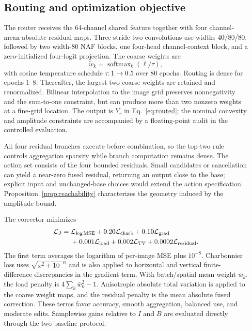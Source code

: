 \documentclass[12pt]{article}
\newcommand{\MSE}{\operatorname{MSE}}
\newcommand{\softmax}{\operatorname{softmax}}
\begin{document}
\subsection{Routing and optimization objective}
The router receives the 64-channel shared feature together with four channel-mean absolute residual maps. Three stride-two convolutions use widths 40/80/80, followed by two width-80 NAF blocks, one four-head channel-context block, and a zero-initialized four-logit projection. The coarse weights are
\begin{equation}
\widetilde w_k=\softmax_k(\ell/\tau),
\end{equation}
with cosine temperature schedule $\tau:1\rightarrow0.5$ over 80 epochs. Routing is dense for epochs 1--8. Thereafter, the largest two coarse weights are retained and renormalized. Bilinear interpolation to the image grid preserves nonnegativity and the sum-to-one constraint, but can produce more than two nonzero weights at a fine-grid location. The output is $Y_r$ in Eq.~\eqref{eq:routed}; the nominal convexity and amplitude constraints are accompanied by a floating-point audit in the controlled evaluation.

All four residual branches execute before combination, so the top-two rule controls aggregation sparsity while branch computation remains dense. The action set consists of the four bounded residuals. Small candidates or cancellation can yield a near-zero fused residual, returning an output close to the base; explicit input and unchanged-base choices would extend the action specification. Proposition~\ref{prop:reachability} characterizes the geometry induced by the amplitude bound.

The corrector minimizes
\begin{align}
\mathcal L_J={}&\mathcal L_{\log\MSE}
+0.20\mathcal L_{\rm charb}
+0.10\mathcal L_{\rm grad}\nonumber\\
&+0.001\mathcal L_{\rm load}
+0.002\mathcal L_{\rm TV}
+0.0002\mathcal L_{\rm residual}.
\end{align}
The first term averages the logarithm of per-image MSE plus $10^{-8}$. Charbonnier loss uses $\sqrt{x^2+10^{-6}}$ and is also applied to horizontal and vertical finite-difference discrepancies in the gradient term. With batch/spatial mean weight $\bar w_k$, the load penalty is $4\sum_k\bar w_k^2-1$. Anisotropic absolute total variation is applied to the coarse weight maps, and the residual penalty is the mean absolute fused correction. These terms favor accuracy, smooth aggregation, balanced use, and moderate edits. Samplewise gains relative to $I$ and $B$ are evaluated directly through the two-baseline protocol.
\end{document}

